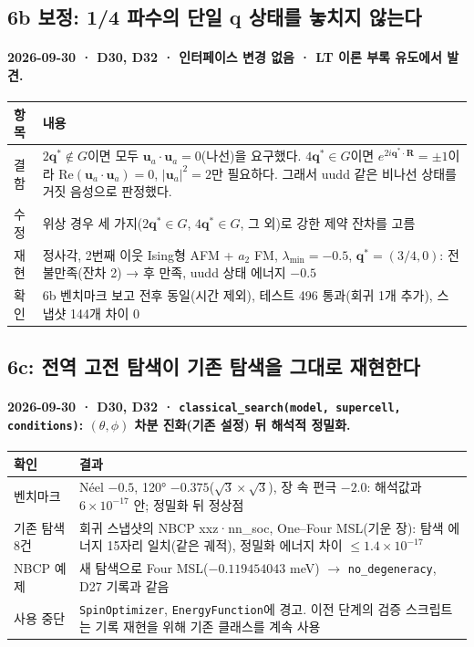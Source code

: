 \subsection{6b 보정: 1/4 파수의 단일 q 상태를 놓치지 않는다}\label{stage6b-quarter}
\begingroup%
  \framesubtitle{2026-09-30 · D30, D32 · 인터페이스 변경 없음 · LT 이론 부록 유도에서 발견.}
  \footnotesize\renewcommand{\arraystretch}{1.08}
  \begin{tabularx}{\textwidth}{@{}P{3.0cm}Y@{}}
    \toprule
    항목 & 내용 \\
    \midrule
    결함 & $2\mathbf q^*\notin G$이면 모두 $\mathbf u_a\cdot\mathbf u_a=0$(나선)을 요구했다. $4\mathbf q^*\in G$이면 $e^{2i\mathbf q^*\cdot\mathbf R}=\pm1$이라 $\mathrm{Re}(\mathbf u_a\cdot\mathbf u_a)=0$, $|\mathbf u_a|^2=2$만 필요하다. 그래서 uudd 같은 비나선 상태를 거짓 음성으로 판정했다. \\
    수정 & 위상 경우 세 가지($2\mathbf q^*\in G$, $4\mathbf q^*\in G$, 그 외)로 강한 제약 잔차를 고름 \\
    재현 & 정사각, 2번째 이웃 Ising형 AFM + $a_2$ FM, $\lambda_{\min}=-0.5$, $\mathbf q^*=(3/4,0)$: 전 불만족(잔차 2) → 후 만족, uudd 상태 에너지 $-0.5$ \\
    확인 & 6b 벤치마크 보고 전후 동일(시간 제외), 테스트 496 통과(회귀 1개 추가), 스냅샷 144개 차이 0 \\
    \bottomrule
  \end{tabularx}
\endgroup


\subsection{6c: 전역 고전 탐색이 기존 탐색을 그대로 재현한다}\label{stage6c}
\begingroup%
  \framesubtitle{2026-09-30 · D30, D32 · \texttt{classical\_search(model, supercell, conditions)}: $(\theta,\phi)$ 차분 진화(기존 설정) 뒤 해석적 정밀화.}
  \footnotesize\renewcommand{\arraystretch}{1.08}
  \begin{tabularx}{\textwidth}{@{}P{3.4cm}Y@{}}
    \toprule
    확인 & 결과 \\
    \midrule
    벤치마크 & Néel $-0.5$, 120° $-0.375$($\sqrt3\times\sqrt3$), 장 속 편극 $-2.0$: 해석값과 $6\times10^{-17}$ 안; 정밀화 뒤 정상점 \\
    기존 탐색 8건 & 회귀 스냅샷의 NBCP xxz·nn\_soc, One--Four MSL(기운 장): 탐색 에너지 15자리 일치(같은 궤적), 정밀화 에너지 차이 $\le1.4\times10^{-17}$ \\
    NBCP 예제 & 새 탐색으로 Four MSL($-0.119454043$ meV) $\to$ \texttt{no\_degeneracy}, D27 기록과 같음 \\
    사용 중단 & \texttt{SpinOptimizer}, \texttt{EnergyFunction}에 경고. 이전 단계의 검증 스크립트는 기록 재현을 위해 기존 클래스를 계속 사용 \\
    \bottomrule
  \end{tabularx}
  \par\smallskip
\endgroup


